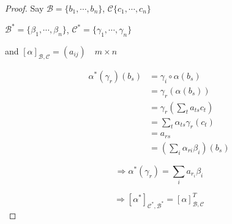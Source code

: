 \documentclass[a4paper]{article}
\begin{document}
\begin{proof}
	 Say $ \mathcal{B} = \{ b_{1},\cdots,b_{n} \} $, $ \mathcal{C} \{ c_{1},\cdots,c_{n} \} $
	 
	 $ \mathcal{B}^{*} = \{  \beta_{1},\cdots,\beta_{n} \} $, $ \mathcal{C}^{*} = \{  \gamma_{1},\cdots,\gamma_{n} \} $
	 
	 and $ [\alpha]_{\mathcal{B},\mathcal{C}} = (a_{ij}) \quad m \times n $


\begin{align*}
\alpha^{*}(\gamma_{r}) (b_{s}) & = \gamma_{i} \circ \alpha(b_{s}) \\
& = \gamma_{r} (\alpha(b_{s})) \\
& = \gamma_{r} \left( \sum_{t} a_{ts}c_{t} \right) \\
& = \sum_{t} \alpha_{ts}\gamma_{r}(c_{t}) \\
& = a_{rs} \\
& = \left(  \sum_{i} \alpha_{ri} \beta_{i} \right)(b_{s})
\end{align*}

\[ \Rightarrow \alpha^{*}(\gamma_{r}) = \sum_{i} a_{r_{i}} \beta_{i} \]

\[ \Rightarrow [\alpha^{*}]_{\mathcal{C}^{*},\mathcal{B}^{*}} = [\alpha]_{\mathcal{B},\mathcal{C}}^{T} \]

\end{proof}
\end{document}
